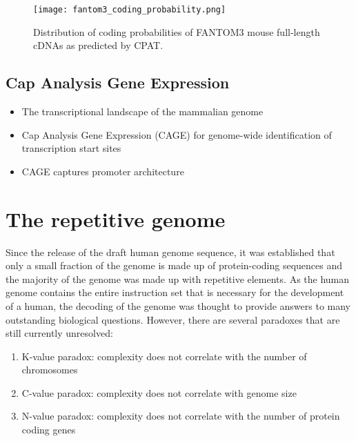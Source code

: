 \begin{figure}[h]
   \centering
   \texttt{[image: fantom3\_coding\_probability.png]}
   \caption[Coding probability of FANTOM3 mouse cDNAs]{Distribution of coding probabilities of FANTOM3 mouse full-length cDNAs as predicted by CPAT\cite{tang2014fantom3codingprob}.}
   \label{fig:fantom3_coding_prob}
\end{figure}

\subsection{Cap Analysis Gene Expression}

\begin{itemize}

   \item The transcriptional landscape of the mammalian genome\cite{pmid16141072}
   \item Cap Analysis Gene Expression (CAGE) for genome-wide identification of transcription start sites
   \item CAGE captures promoter architecture\cite{pmid16645617}

\end{itemize}

\section{The repetitive genome}

Since the release of the draft human genome sequence\cite{venter2001sequence, lander2001initial}, it was established that only a small fraction of the genome is made up of protein-coding sequences and the majority of the genome was made up with repetitive elements. As the human genome contains the entire instruction set that is necessary for the development of a human, the decoding of the genome was thought to provide answers to many outstanding biological questions. However, there are several paradoxes that are still currently unresolved:

\begin{enumerate}
   \item K-value paradox: complexity does not correlate with the number of chromosomes
   \item C-value paradox: complexity does not correlate with genome size
   \item N-value paradox: complexity does not correlate with the number of protein coding genes
\end{enumerate}

